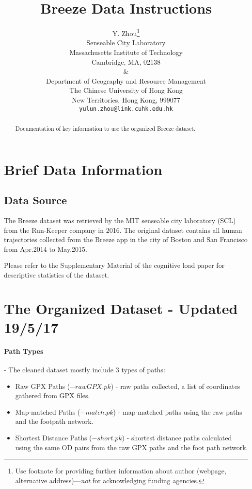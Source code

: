 \documentclass{article}
\title{Breeze Data Instructions}
\author{
  Y. Zhou\thanks{Use footnote for providing further
    information about author (webpage, alternative
    address)---\emph{not} for acknowledging funding agencies.} \\ Senseable City Laboratory \\
    Massachusetts Institute of Technology\\ Cambridge, MA, 02138 \\ \& \\
  Department of Geography and Resource Management\\
  The Chinese University of Hong Kong\\
  New Territories, Hong Kong, 999077 \\
  \texttt{yulun.zhou@link.cuhk.edu.hk} \\}
\begin{document}
\maketitle

\begin{abstract}
Documentation of key information to use the organized Breeze dataset. 
\end{abstract}






\tableofcontents

\newpage
\section{Brief Data Information}
\subsection{Data Source}
The Breeze dataset was retrieved by the MIT senseable city laboratory (SCL) from the Run-Keeper company in 2016. The original dataset contains all human trajectories collected from the Breeze app in the city of Boston and San Francisco from Apr.2014 to May.2015.

Please refer to the Supplementary Material of the cognitive load paper for descriptive statistics of the dataset. 

\section{The Organized Dataset - Updated 19/5/17}

\paragraph{Path Types} - The cleaned dataset mostly include 3 types of paths:
\begin{itemize}
    \item Raw GPX Paths ($-rawGPX.pk$) - raw paths collected, a list of coordinates gathered from GPX files. 
    \item Map-matched Paths ($-match.pk$) - map-matched paths using the raw paths and the footpath network. 
    \item Shortest Distance Paths ($-short.pk$) - shortest distance paths calculated using the same OD pairs from the raw GPX paths and the foot path network. 
\end{itemize}
\end{document}
